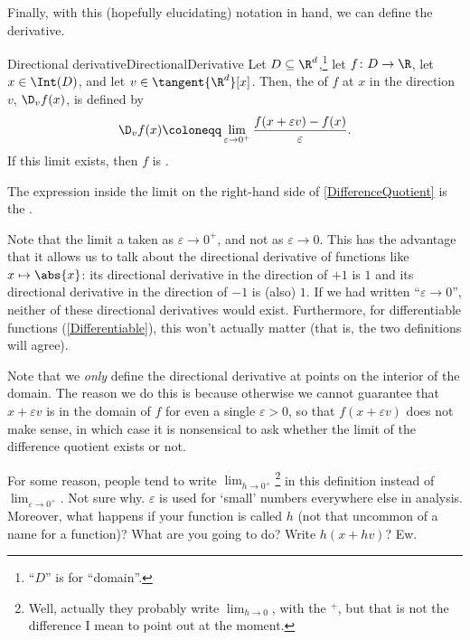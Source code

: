 Finally, with this (hopefully elucidating) notation in hand, we can define the derivative.
\begin{dfn}{Directional derivative}{DirectionalDerivative}
Let $D\subseteq \R ^d$,\footnote{``$D$'' is for ``domain''.} let $f\colon D\rightarrow \R$, let $x\in \Int (D)$, and let $v\in \tangent{\R ^d}[x]$.  Then, the  of $f$ at $x$ in the direction $v$, $\D _vf(x)$, is defined by
\begin{equation}\label{DifferenceQuotient}
\D _vf(x)\coloneqq \lim _{\varepsilon \to 0^+}\frac{f(x+\varepsilon v)-f(x)}{\varepsilon}.
\end{equation}
If this limit exists, then $f$ is .

The expression inside the limit on the right-hand side of \eqref{DifferenceQuotient} is the .
\begin{rmk}
Note that the limit a taken as $\varepsilon \to 0^+$, and not as $\varepsilon \to 0$.  This has the advantage that it allows us to talk about the directional derivative of functions like $x\mapsto \abs{x}$:  its directional derivative in the direction of $+1$ is $1$ and its directional derivative in the direction of $-1$ is (also) $1$.  If we had written ``$\varepsilon \to 0$'', neither of these directional derivatives would exist.  Furthermore, for differentiable functions (\cref{Differentiable}), this won't actually matter (that is, the two definitions will agree).
\end{rmk}
\begin{rmk}
Note that we \emph{only} define the directional derivative at points on the interior of the domain.  The reason we do this is because otherwise we cannot guarantee that $x+\varepsilon v$ is in the domain of $f$ for even a single $\varepsilon >0$, so that $f(x+\varepsilon v)$ does not make sense, in which case it is nonsensical to ask whether the limit of the difference quotient exists or not.
\end{rmk}
\begin{rmk}
For some reason, people tend to write $\lim _{h\to 0^+}$\footnote{Well, actually they probably write $\lim _{h\to 0}$, with the $^+$, but that is not the difference I mean to point out at the moment.} in this definition instead of $\lim _{\varepsilon \to 0^+}$.  Not sure why.  $\varepsilon$ is used for `small' numbers everywhere else in analysis.  Moreover, what happens if your function is called $h$ (not that uncommon of a name for a function)?  What are you going to do?  Write $h(x+hv)$?  Ew.
\end{rmk}
\end{dfn}
